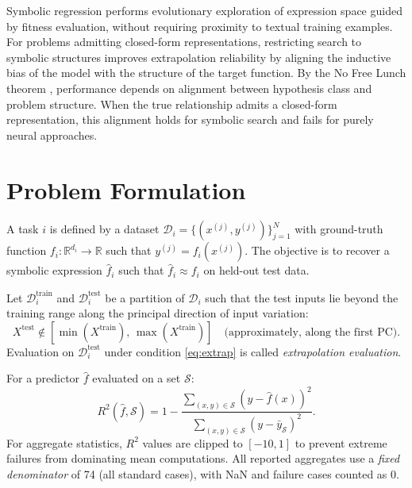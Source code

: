\documentclass[twoside,11pt]{article}
\newcommand{\Rsq}{R^{2}}
\begin{document}
Symbolic regression performs evolutionary exploration of expression space guided by fitness evaluation, without requiring proximity to textual training examples. For problems admitting closed-form representations, restricting search to symbolic structures improves extrapolation reliability by aligning the inductive bias of the model with the structure of the target function. By the No Free Lunch theorem \citep{wolpert1997no}, performance depends on alignment between hypothesis class and problem structure. When the true relationship admits a closed-form representation, this alignment holds for symbolic search and fails for purely neural approaches.

\section{Problem Formulation}
\label{sec:problem}

\begin{definition}
A task $i$ is defined by a dataset $\mathcal{D}_i = \{(x^{(j)}, y^{(j)})\}_{j=1}^{N}$
with ground-truth function $f_i: \mathbb{R}^{d_i} \to \mathbb{R}$ such that
$y^{(j)} = f_i(x^{(j)})$.  The objective is to recover a symbolic expression
$\hat{f}_i$ such that $\hat{f}_i \approx f_i$ on held-out test data.
\end{definition}

\begin{definition}
Let $\mathcal{D}^{\mathrm{train}}_i$ and $\mathcal{D}^{\mathrm{test}}_i$ be a
partition of $\mathcal{D}_i$ such that the test inputs lie beyond the training range
along the principal direction of input variation:
\begin{equation}
  X^{\mathrm{test}} \notin [\min(X^{\mathrm{train}}),\, \max(X^{\mathrm{train}})]
  \quad \text{(approximately, along the first PC)}.
  \label{eq:extrap}
\end{equation}
Evaluation on $\mathcal{D}^{\mathrm{test}}_i$ under condition \eqref{eq:extrap}
is called \emph{extrapolation evaluation}.
\end{definition}

\begin{definition}
For a predictor $\hat{f}$ evaluated on a set $\mathcal{S}$:
\begin{equation}
  \Rsq(\hat{f}, \mathcal{S}) = 1 - \frac{\sum_{(x,y)\in\mathcal{S}}(y - \hat{f}(x))^2}
                                         {\sum_{(x,y)\in\mathcal{S}}(y - \bar{y}_{\mathcal{S}})^2}.
  \label{eq:r2}
\end{equation}
For aggregate statistics, $\Rsq$ values are clipped to $[-10, 1]$ to prevent
extreme failures from dominating mean computations.  All reported aggregates use a
\emph{fixed denominator} of 74 (all standard cases), with NaN and failure cases
counted as 0.
\end{definition}
\end{document}
